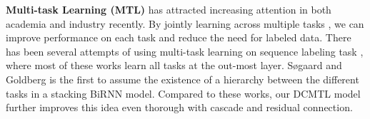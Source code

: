 \textbf{Multi-task Learning (MTL)} has attracted increasing attention
in both academia and industry recently.
By jointly learning across multiple tasks \cite{caruana1998multitask}, we can
improve performance on each task and reduce the need for labeled data.
There has been several attempts of using multi-task learning on 
sequence labeling task \cite{peng2016multi,peng2016improving,yang2017transfer},
where most of these works learn all tasks at the out-most layer.
Søgaard and Goldberg  is the first to 
assume the existence of a hierarchy between the different tasks in a stacking BiRNN model.
Compared to these works, our DCMTL model further improves this 
idea even thorough with cascade and residual connection.


